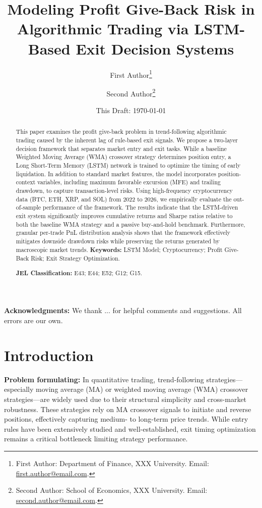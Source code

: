 \documentclass[12pt]{article}
\title{\textbf{Modeling Profit Give-Back Risk in Algorithmic Trading via LSTM-Based Exit Decision Systems}}
\author{
First Author\thanks{
First Author: Department of Finance, XXX University.
Email: \href{mailto:first.author@email.com}{first.author@email.com}.
}
\and
Second Author\thanks{
Second Author: School of Economics, XXX University.
Email: \href{mailto:second.author@email.com}{second.author@email.com}.
}
}
\date{
This Draft: \today
}
\begin{document}
\maketitle

\begin{abstract}
\noindent
This paper examines the profit give-back problem in trend-following algorithmic trading caused by the inherent lag of rule-based exit signals. We propose a two-layer decision framework that separates market entry and exit tasks. While a baseline Weighted Moving Average (WMA) crossover strategy determines position entry, a Long Short-Term Memory (LSTM) network is trained to optimize the timing of early liquidation. In addition to standard market features, the model incorporates position-context variables, including maximum favorable excursion (MFE) and trailing drawdown, to capture transaction-level risks. Using high-frequency cryptocurrency data (BTC, ETH, XRP, and SOL) from 2022 to 2026, we empirically evaluate the out-of-sample performance of the framework. The results indicate that the LSTM-driven exit system significantly improves cumulative returns and Sharpe ratios relative to both the baseline WMA strategy and a passive buy-and-hold benchmark. Furthermore, granular per-trade PnL distribution analysis shows that the framework effectively mitigates downside drawdown risks while preserving the returns generated by macroscopic market trends.
\vspace{0.5em}
\noindent
\textbf{Keywords:} LSTM Model; Cryptocurrency; Profit Give-Back Risk; Exit Strategy Optimization.

\vspace{0.5em}
\noindent
\textbf{JEL Classification:} E43; E44; E52; G12; G15.
\end{abstract}

\vspace{1em}

\noindent
\textbf{Acknowledgments:}
We thank ... for helpful comments and suggestions. All errors are our own.

\newpage

\section{Introduction}\label{sec:introduction}

\textbf{Problem formulating:} In quantitative trading, trend-following strategies—especially moving average (MA) or 
weighted moving average (WMA) crossover strategies—are widely used due to their structural 
simplicity and cross-market robustness. These strategies rely on MA crossover signals to 
initiate and reverse positions, effectively capturing medium- to long-term price trends. 
While entry rules have been extensively studied and well-established, exit timing 
optimization remains a critical bottleneck limiting strategy performance.
\end{document}
